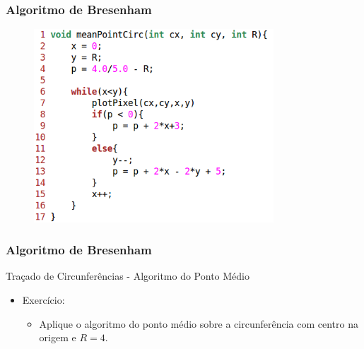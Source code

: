 \documentclass{beamer}
\begin{document}
\begin{frame}
\frametitle{Algoritmo de Bresenham}
	\begin{figure}[!h]
			\begin{flushleft}
				\includegraphics[width=0.8\textwidth]{Figures/MeaPoi}
			\end{flushleft}
		\end{figure}
\end{frame}


\begin{frame}
\frametitle{Algoritmo de Bresenham}
		\begin{block}{Traçado de Circunferências - Algoritmo do Ponto Médio}
		\begin{itemize}
			\item Exercício:
				\begin{itemize}
					\item Aplique o algoritmo do ponto médio sobre a circunferência com centro na origem e $R = 4$.
				\end{itemize}
			
		\end{itemize}
	\end{block}

\end{frame}
\end{document}
